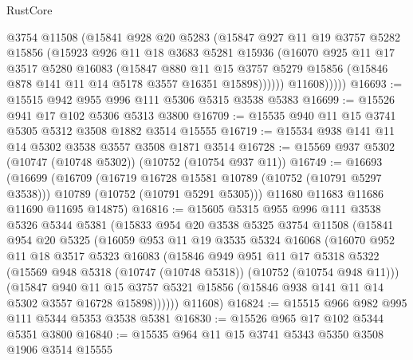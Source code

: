 \begin{lexlean}{RustCore}
\begin{coremodule}
              @3754
              @11508
              (@15841
                @928
                @20
                @5283
                (@15847
                  @927
                  @11
                  @19
                  @3757
                  @5282
                  @15856
                  (@15923
                    @926
                    @11
                    @18
                    @3683
                    @5281
                    @15936
                    (@16070
                      @925
                      @11
                      @17
                      @3517
                      @5280
                      @16083
                      (@15847
                        @880
                        @11
                        @15
                        @3757
                        @5279
                        @15856
                        (@15846 @878 @141 @11 @14 @5178 @3557 @16351 @15898))))))
              @11608)))))
@16693 := @15515 @942 @955 @996 @111 @5306 @5315 @3538 @5383
@16699 := @15526 @941 @17 @102 @5306 @5313 @3800
@16709 := @15535 @940 @11 @15 @3741 @5305 @5312 @3508 @1882 @3514 @15555
@16719 := @15534 @938 @141 @11 @14 @5302 @3538 @3557 @3508 @1871 @3514
@16728 := @15569 @937 @5302 (@10747 (@10748 @5302)) (@10752 (@10754 @937 @11))
@16749 := @16693
    (@16699
      (@16709
        (@16719 @16728 @15581 @10789 (@10752 (@10791 @5297 @3538)))
        @10789
        (@10752 (@10791 @5291 @5305)))
      @11680
      @11683
      @11686
      @11690
      @11695
      @14875)
@16816 := @15605
    @5315
    @955
    @996
    @111
    @3538
    @5326
    @5344
    @5381
    (@15833
      @954
      @20
      @3538
      @5325
      @3754
      @11508
      (@15841
        @954
        @20
        @5325
        (@16059
          @953
          @11
          @19
          @3535
          @5324
          @16068
          (@16070
            @952
            @11
            @18
            @3517
            @5323
            @16083
            (@15846
              @949
              @951
              @11
              @17
              @5318
              @5322
              (@15569 @948 @5318 (@10747 (@10748 @5318)) (@10752 (@10754 @948 @11)))
              (@15847
                @940
                @11
                @15
                @3757
                @5321
                @15856
                (@15846 @938 @141 @11 @14 @5302 @3557 @16728 @15898))))))
      @11608)
@16824 := @15515 @966 @982 @995 @111 @5344 @5353 @3538 @5381
@16830 := @15526 @965 @17 @102 @5344 @5351 @3800
@16840 := @15535 @964 @11 @15 @3741 @5343 @5350 @3508 @1906 @3514 @15555

\end{coremodule}
\end{lexlean}

